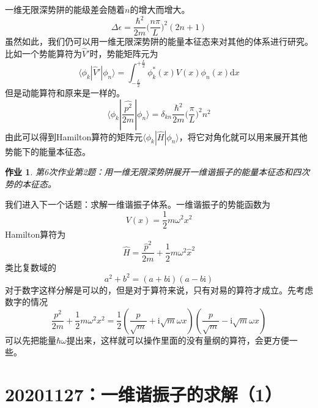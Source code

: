\documentclass[12pt]{article}
\newtheorem{asg}{作业}
\begin{document}
    一维无限深势阱的能级差会随着$n$的增大而增大。
    \[ \Delta \epsilon = \frac {\hbar^2}{2m} \bigg(\frac {n\pi}L \bigg)^2 (2n+1) \]
    虽然如此，我们仍可以用一维无限深势阱的能量本征态来对其他的体系进行研究。比如一个势能算符为$\hat{V}'$时，势能矩阵元为
    \[
        \langle \phi_k | \hat{V}' | \phi_n \rangle = \int_{-\frac L2}^{+\frac L2} \phi_k^*(x) V(x) \phi_n(x) \mathrm{d}x 
    \]
    但是动能算符和原来是一样的。
    \[
        \langle \phi_k | \frac {\hat{p^2}}{2m} | \phi_n \rangle = \delta_{kn} \frac {\hbar^2}{2m} \bigg( \frac {\pi}L \bigg)^2 n^2
    \]
    由此可以得到Hamilton算符的矩阵元$\langle \phi_k | \hat{H} | \phi_n \rangle$，将它对角化就可以用来展开其他势能下的能量本征态。
    \begin{asg}
        第6次作业第2题：用一维无限深势阱展开一维谐振子的能量本征态和四次势的本征态。
    \end{asg}

    我们进入下一个话题：求解一维谐振子体系。一维谐振子的势能函数为
    \[ V(x) = \frac 12 m\omega^2x^2 \]
    Hamilton算符为
    \[ \hat{H} = \frac {\hat{p}^2}{2m} + \frac 12 m\omega^2 \hat{x}^2 \]
    类比复数域的
    \[ a^2 + b^2 = (a+b\mathrm{i})(a-b\mathrm{i}) \]
    对于数字这样分解是可以的，但是对于算符来说，只有对易的算符才成立。先考虑数字的情况
    \[ \frac {p^2}{2m} + \frac 12 m\omega^2 x^2 = \frac 12 (\frac p{\sqrt{m}} + \mathrm{i}\sqrt{m}\omega x)(\frac p{\sqrt{m}} - \mathrm{i}\sqrt{m}\omega x) \]
    可以先把能量$\hbar \omega$提出来，这样就可以操作里面的没有量纲的算符，会更方便一些。

\section{20201127：一维谐振子的求解（1）}
\end{document}
